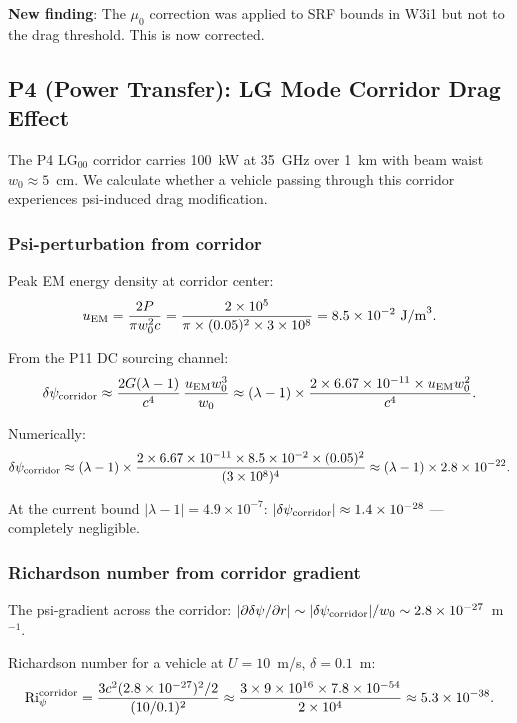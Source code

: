 \documentclass[11pt,twocolumn]{article}
\newcommand{\dpsi}{\delta\psi}
\newcommand{\lam}{\lambda}
\newcommand{\Ri}{\mathrm{Ri}}
\begin{document}
\textbf{New finding}: The $\mu_0$ correction was applied to SRF bounds in W3i1
but not to the drag threshold. This is now corrected.

\subsection{P4 (Power Transfer): LG Mode Corridor Drag Effect}
\label{sec:p4_drag}

The P4 LG$_{00}$ corridor carries 100~kW at 35~GHz over 1~km with beam
waist $w_0 \approx 5$~cm. We calculate whether a vehicle passing through
this corridor experiences psi-induced drag modification.

\subsubsection{Psi-perturbation from corridor}

Peak EM energy density at corridor center:
\begin{equation}
u_{\rm EM} = \frac{2P}{\pi w_0^2 c} = \frac{2\times10^5}{\pi\times(0.05)^2
\times 3\times10^8} = 8.5\times10^{-2}~\text{J/m}^3.
\end{equation}

From the P11 DC sourcing channel:
\begin{equation}
\dpsi_{\rm corridor} \approx \frac{2G(\lam-1)}{c^4}\,\frac{u_{\rm EM}w_0^3}{w_0}
\approx (\lam-1)\times\frac{2\times6.67\times10^{-11}\times u_{\rm EM}w_0^2}{c^4}.
\end{equation}

Numerically:
\begin{equation}
\dpsi_{\rm corridor} \approx (\lam-1)\times
\frac{2\times6.67\times10^{-11}\times8.5\times10^{-2}\times(0.05)^2}
{(3\times10^8)^4}
\approx (\lam-1)\times 2.8\times10^{-22}.
\label{eq:dpsi_corridor}
\end{equation}

At the current bound $|\lam-1| = 4.9\times10^{-7}$:
$|\dpsi_{\rm corridor}| \approx 1.4\times10^{-28}$ --- completely negligible.

\subsubsection{Richardson number from corridor gradient}

The psi-gradient across the corridor: $|\partial\dpsi/\partial r| \sim
|\dpsi_{\rm corridor}|/w_0 \sim 2.8\times10^{-27}$~m$^{-1}$.

Richardson number for a vehicle at $U = 10$~m/s, $\delta = 0.1$~m:
\begin{equation}
\Ri_\psi^{\rm corridor} = \frac{3c^2(2.8\times10^{-27})^2/2}
{(10/0.1)^2}
\approx \frac{3\times9\times10^{16}\times7.8\times10^{-54}}
{2\times10^4}
\approx 5.3\times10^{-38}.
\end{equation}
\end{document}
